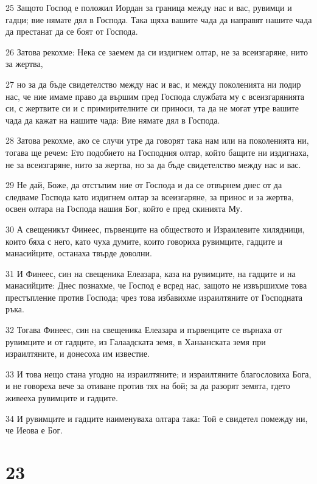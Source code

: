 \par 25 Защото Господ е положил Иордан за граница между нас и вас, рувимци и гадци; вие нямате дял в Господа. Така щяха вашите чада да направят нашите чада да престанат да се боят от Господа.
\par 26 Затова рекохме: Нека се заемем да си издигнем олтар, не за всеизгаряне, нито за жертва,
\par 27 но за да бъде свидетелство между нас и вас, и между поколенията ни подир нас, че ние имаме право да вършим пред Господа службата му с всеизгарянията си, с жертвите си и с примирителните си приноси, та да не могат утре вашите чада да кажат на нашите чада: Вие нямате дял в Господа.
\par 28 Затова рекохме, ако се случи утре да говорят така нам или на поколенията ни, тогава ще речем: Ето подобието на Господния олтар, който бащите ни издигнаха, не за всеизгаряне, нито за жертва, но за да бъде свидетелство между нас и вас.
\par 29 Не дай, Боже, да отстъпим ние от Господа и да се отвърнем днес от да следваме Господа като издигнем олтар за всеизгаряне, за принос и за жертва, освен олтара на Господа нашия Бог, който е пред скинията Му.
\par 30 А свещеникът Финеес, първенците на обществото и Израилевите хилядници, които бяха с него, като чуха думите, които говориха рувимците, гадците и манасийците, останаха твърде доволни.
\par 31 И Финеес, син на свещеника Елеазара, каза на рувимците, на гадците и на манасийците: Днес познахме, че Господ е всред нас, защото не извършихме това престъпление против Господа; чрез това избавихме израилтяните от Господната ръка.
\par 32 Тогава Финеес, син на свещеника Елеазара и първенците се върнаха от рувимците и от гадците, из Галаадската земя, в Ханаанската земя при израилтяните, и донесоха им известие.
\par 33 И това нещо стана угодно на израилтяните; и израилтяните благословиха Бога, и не говореха вече за отиване против тях на бой; за да разорят земята, гдето живееха рувимците и гадците.
\par 34 И рувимците и гадците наименуваха олтара така: Той е свидетел помежду ни, че Иеова е Бог.

\chapter{23}


